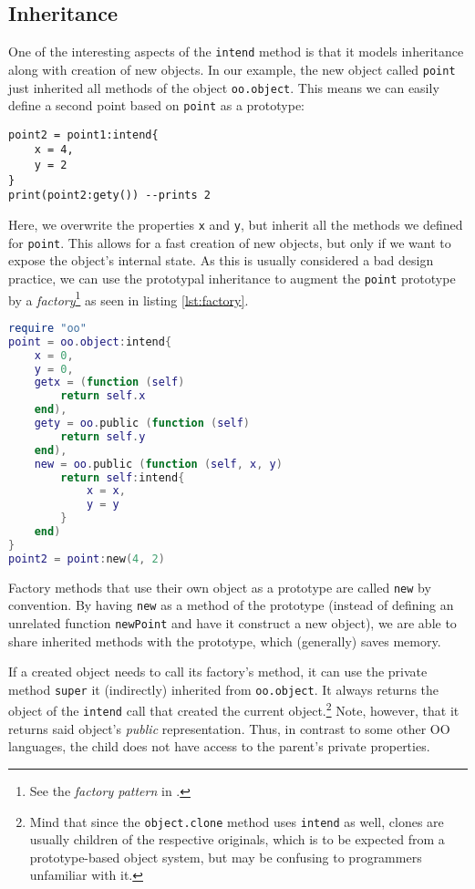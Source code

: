 \subsection{Inheritance}

One of the interesting aspects of the \texttt{intend} method is that it models inheritance along with creation of new objects. In our example, the new object called \texttt{point} just inherited all methods of the object \texttt{oo.object}. This means we can easily define a second point based on \texttt{point} as a prototype:

\begin{lstlisting}[caption={Using \texttt{point1} as a protoype (continued from listing \ref{lst:point})}, label=lst:point2, name=lst:point]
point2 = point1:intend{
	x = 4,
	y = 2
}
print(point2:gety()) --prints 2
\end{lstlisting}

Here, we overwrite the properties \texttt{x} and \texttt{y}, but inherit all the methods we defined for \texttt{point}. This allows for a fast creation of new objects, but only if we want to expose the object's internal state. As this is usually considered a bad design practice, we can use the prototypal inheritance to augment the \texttt{point} prototype by a \emph{factory}\footnote{See the \emph{factory pattern} in \cite{GOF}.} as seen in listing \ref{lst:factory}.

\begin{lstlisting}[language=lua, caption={Building a factory for points.}, label=lst:factory, name=lst:factory]
require "oo"
point = oo.object:intend{
	x = 0,
	y = 0,
	getx = (function (self)
		return self.x
	end),
	gety = oo.public (function (self)
		return self.y
	end),
	new = oo.public (function (self, x, y)
		return self:intend{
			x = x,
			y = y
		}
	end)
}
point2 = point:new(4, 2)
\end{lstlisting}

Factory methods that use their own object as a prototype are called \texttt{new} by convention. By having \texttt{new} as a method of the prototype (instead of defining an unrelated function \texttt{newPoint} and have it construct a new object), we are able to share inherited methods with the prototype, which (generally) saves memory.

If a created object needs to call its factory's method, it can use the private method \texttt{super} it (indirectly) inherited from \texttt{oo.object}. It always returns the object of the \texttt{intend} call that created the current object.\footnote{Mind that since the \texttt{object.clone} method uses \texttt{intend} as well, clones are usually children of the respective originals, which is to be expected from a prototype-based object system, but may be confusing to programmers unfamiliar with it.} Note, however, that it returns said object's \emph{public} representation. Thus, in contrast to some other OO languages, the child does not have access to the parent's private properties.

